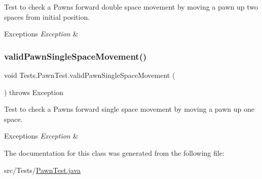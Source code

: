 Test to check a Pawn\textquotesingle{}s forward double space movement by moving a pawn up two spaces from initial position. 
\begin{DoxyExceptions}{Exceptions}
{\em Exception} & \\
\hline
\end{DoxyExceptions}
\hypertarget{class_tests_1_1_pawn_test_afc62c7df60ea48714139aa3b1fdec002}{}\label{class_tests_1_1_pawn_test_afc62c7df60ea48714139aa3b1fdec002} 
\subsubsection{\texorpdfstring{valid\+Pawn\+Single\+Space\+Movement()}{validPawnSingleSpaceMovement()}}
{\footnotesize\ttfamily void Tests.\+Pawn\+Test.\+valid\+Pawn\+Single\+Space\+Movement (\begin{DoxyParamCaption}{ }\end{DoxyParamCaption}) throws Exception}

Test to check a Pawn\textquotesingle{}s forward single space movement by moving a pawn up one space. 
\begin{DoxyExceptions}{Exceptions}
{\em Exception} & \\
\hline
\end{DoxyExceptions}


The documentation for this class was generated from the following file\+:\begin{DoxyCompactItemize}
\item 
src/\+Tests/\hyperlink{_pawn_test_8java}{Pawn\+Test.\+java}\end{DoxyCompactItemize}
